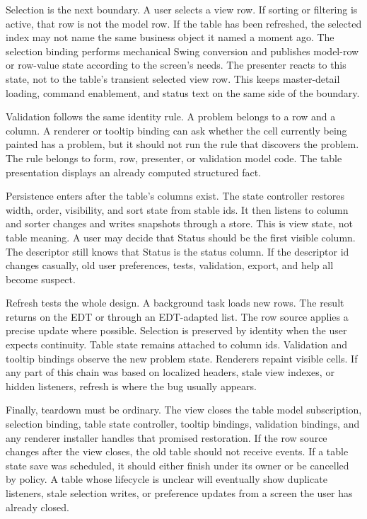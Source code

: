 Selection is the next boundary. A user selects a view row. If sorting or
filtering is active, that row is not the model row. If the table has been
refreshed, the selected index may not name the same business object it named a
moment ago. The selection binding performs mechanical Swing conversion and
publishes model-row or row-value state according to the screen's needs. The
presenter reacts to this state, not to the table's transient selected view
row. This keeps master-detail loading, command enablement, and status text on
the same side of the boundary.

Validation follows the same identity rule. A problem belongs to a row and a
column. A renderer or tooltip binding can ask whether the cell currently being
painted has a problem, but it should not run the rule that discovers the
problem. The rule belongs to form, row, presenter, or validation model code.
The table presentation displays an already computed structured fact.

Persistence enters after the table's columns exist. The state controller
restores width, order, visibility, and sort state from stable ids. It then
listens to column and sorter changes and writes snapshots through a store.
This is view state, not table meaning. A user may decide that Status should be
the first visible column. The descriptor still knows that Status is the status
column. If the descriptor id changes casually, old user preferences, tests,
validation, export, and help all become suspect.

Refresh tests the whole design. A background task loads new rows. The result
returns on the EDT or through an EDT-adapted list. The row source applies a
precise update where possible. Selection is preserved by identity when the
user expects continuity. Table state remains attached to column ids.
Validation and tooltip bindings observe the new problem state. Renderers
repaint visible cells. If any part of this chain was based on localized
headers, stale view indexes, or hidden listeners, refresh is where the bug
usually appears.

Finally, teardown must be ordinary. The view closes the table model
subscription, selection binding, table state controller, tooltip bindings,
validation bindings, and any renderer installer handles that promised
restoration. If the row source changes after the view closes, the old table
should not receive events. If a table state save was scheduled, it should
either finish under its owner or be cancelled by policy. A table whose
lifecycle is unclear will eventually show duplicate listeners, stale selection
writes, or preference updates from a screen the user has already closed.

